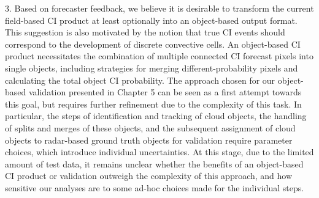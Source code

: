3. Based on forecaster feedback, we believe it is desirable to transform the current field-based CI product at least optionally into an object-based output format. This suggestion is also motivated by the notion that true CI events should correspond to the development of discrete convective cells. An object-based CI product necessitates the combination of multiple connected CI forecast pixels into single objects, including strategies for merging different-probability pixels and calculating the total object CI probability. The approach chosen for our object-based validation presented in Chapter 5 can be seen as a first attempt towards this goal, but requires further refinement due to the complexity of this task. In particular, the steps of identification and tracking of cloud objects, the handling of splits and merges of these objects, and the subsequent assignment of cloud objects to radar-based ground truth objects for validation require parameter choices, which introduce individual uncertainties. At this stage, due to the limited amount of test data, it remains unclear whether the benefits of an object-based CI product or validation outweigh the complexity of this approach, and how sensitive our analyses are to some ad-hoc choices made for the individual steps. 
